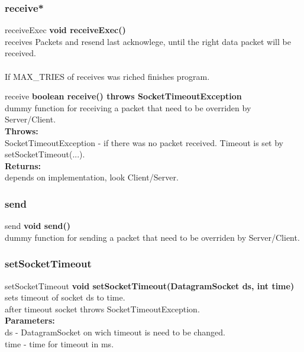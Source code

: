 \documentclass[12pt]{article}
\begin{document}
\subsubsection{receive*}
\begin{mybox}[colback=white]{receiveExec}
\textbf{void receiveExec()} \\
receives Packets and resend last acknowlege, until the right data packet
will be received.\\ \\
If MAX\_TRIES of receives was riched finishes program.
\end{mybox}

\begin{mybox}[colback=white]{receive}
\textbf{boolean receive() throws SocketTimeoutException} \\
dummy function for receiving a packet that need to be overriden
by Server/Client.
\\
\textbf{Throws:} \\
SocketTimeoutException - if there was no packet received. Timeout is
set by setSocketTimeout(...). \\
\textbf{Returns:} \\
depends on implementation, look Client/Server.
\end{mybox}

\subsubsection{send}
\begin{mybox}[colback=white]{send}
\textbf{void send()} \\
dummy function for sending a packet that need to be overriden
by Server/Client.
\end{mybox}

\subsubsection{setSocketTimeout}
\begin{mybox}[colback=white]{setSocketTimeout}
\textbf{void setSocketTimeout(DatagramSocket ds, int time)} \\
sets timeout of socket ds to time. \\
after timeout socket throws SocketTimeoutException. \\
\textbf{Parameters:} \\
ds - DatagramSocket on wich timeout is need to be changed.  \\
time - time for timeout in ms.
\end{mybox}
\end{document}
